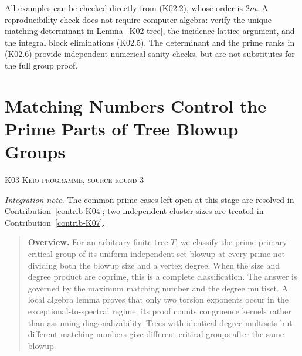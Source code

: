 \documentclass[11pt,a4paper]{article}
\theoremstyle{definition}\newtheorem{definition}[theorem]{Definition}
\theoremstyle{remark}\newtheorem{remark}[theorem]{Remark}
\numberwithin{equation}{section}
\begin{document}
All examples can be checked directly from (K02.2), whose order is $2m$. A reproducibility check does not require computer algebra: verify the unique matching determinant in Lemma~\ref{K02-tree}, the incidence-lattice argument, and the integral block eliminations (K02.5). The determinant and the prime ranks in (K02.6) provide independent numerical sanity checks, but are not substitutes for the full group proof.





\clearpage
\section[K03 --- Matching Numbers Control the Prime Parts of Tree Blowup Groups]{Matching Numbers Control the Prime Parts of Tree Blowup Groups}\label{contrib-K03}
\noindent\textsc{K03 \quad Keio programme, source round 3}\par\medskip
\noindent\textit{Integration note.} The common-prime cases left open at this stage are resolved in Contribution~\ref{contrib-K04}; two independent cluster sizes are treated in Contribution~\ref{contrib-K07}.\par\medskip


\begin{quote}\small\textbf{Overview.} For an arbitrary finite tree $T$, we classify the prime-primary critical group of its uniform independent-set blowup at every prime not dividing both the blowup size and a vertex degree. When the size and degree product are coprime, this is a complete classification. The answer is governed by the maximum matching number and the degree multiset. A local algebra lemma proves that only two torsion exponents occur in the exceptional-to-spectral regime; its proof counts congruence kernels rather than assuming diagonalizability. Trees with identical degree multisets but different matching numbers give different critical groups after the same blowup.\end{quote}
\end{document}
